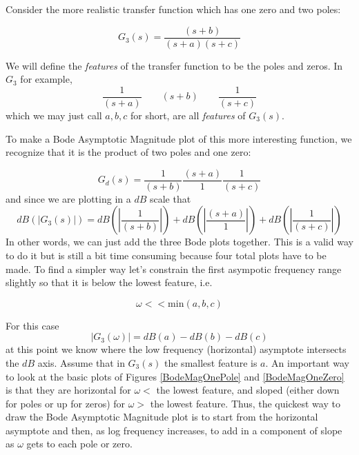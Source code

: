 Consider the more realistic transfer function which has one zero and two poles:

\[
G_3(s) = \frac    {(s+b)} {(s+a)(s+c)}
\]

We will define the {\it features} of the transfer function to be the  poles and zeros.
In $G_3$ for example,
\[
\frac {1} {(s+a)} \qquad {(s+b)} \qquad\frac {1} {(s+c)}
\]
which we may just call $a,b,c$ for short, are all {\it features} of $G_3(s)$.

To make a Bode Asymptotic Magnitude plot of this more interesting function, we recognize that it is the product of two poles and one zero:

\[
G_d(s) = \frac {1} {(s+b)}  \frac {(s+a)} {1}  \frac {1} {(s+c)}
\]
and since we are plotting in a $dB$ scale that
\[
dB(|G_3(s)|) =  dB(\left |\frac {1} {(s+b)}\right |) +   dB(\left |\frac {(s+a)} {1}\right | ) +  dB( \left | \frac {1} {(s+c)}\right |  )
\]
In other words, we can just add the three Bode plots together.   This is a valid way to do it but is still a bit time consuming because four total plots have to be made.   To find a simpler way let's constrain the first asympotic frequency range slightly so that it is below the lowest feature, i.e.

\[
\omega <<  \mathrm{min}(a,b,c)
\]

For this case
\[
|G_3(\omega)| = dB(a) - dB(b)  - dB(c)
\]
at this point we know where the low frequency (horizontal) asymptote intersects the $dB$ axis.
Assume that in $G_3(s)$ the smallest feature is $a$.
An important way to look at the basic plots of Figures \ref{BodeMagOnePole} and \ref{BodeMagOneZero} is that they are horizontal for $\omega < $ the lowest feature, and sloped (either down for poles or up for zeros) for $\omega > $ the lowest feature.
Thus, the quickest way to draw the Bode Asymptotic Magnitude plot is to start from the horizontal asymptote and then,
as log frequency increases, to add in a component of slope as $\omega$ gets to each pole or zero.



